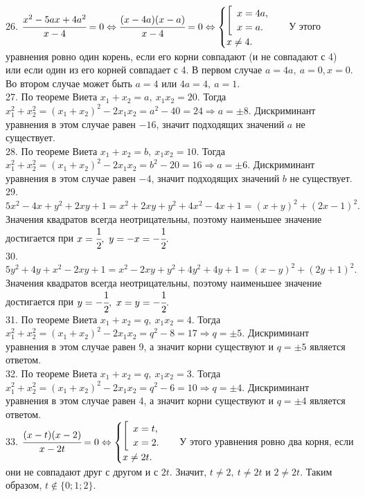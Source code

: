 \documentclass[12pt]{article}
\begin{document}
26. $\cfrac{x^2-5ax+4a^2}{x-4}=0\Leftrightarrow\cfrac{(x-4a)(x-a)}{x-4}=0\Leftrightarrow\begin{cases}\left[\begin{array}{l}x=4a,\\ x=a.\end{array}\right.\\x\neq4.\end{cases}$ У этого уравнения ровно один корень, если его корни совпадают (и не совпадают с 4) или если один из его корней совпадает с 4. В первом случае $a=4a,\ a=0, x=0.$ Во втором случае может быть $a=4$ или $4a=4,\ a=1.$\\
27. По теореме Виета $x_1+x_2=a,\ x_1x_2=20.$ Тогда $x_1^2+x_2^2=(x_1+x_2)^2-2x_1x_2=a^2-40=24\Rightarrow a=\pm8.$ Дискриминант уравнения в этом случае равен $-16$, значит подходящих значений $a$ не существует.\\
28. По теореме Виета $x_1+x_2=b,\ x_1x_2=10.$ Тогда $x_1^2+x_2^2=(x_1+x_2)^2-2x_1x_2=b^2-20=16\Rightarrow a=\pm6.$ Дискриминант уравнения в этом случае равен $-4$, значит подходящих значений $b$ не существует.\\
29. $5x^2-4x+y^2+2xy+1=x^2+2xy+y^2+4x^2-4x+1=(x+y)^2+(2x-1)^2.$ Значения квадратов всегда неотрицательны, поэтому наименьшее значение достигается при $x=\cfrac{1}{2},\ y=-x=-\cfrac{1}{2}.$\\
30. $5y^2+4y+x^2-2xy+1=x^2-2xy+y^2+4y^2+4y+1=(x-y)^2+(2y+1)^2.$ Значения квадратов всегда неотрицательны, поэтому наименьшее значение достигается при $y=-\cfrac{1}{2},\ x=y=-\cfrac{1}{2}.$\\
31. По теореме Виета $x_1+x_2=q,\ x_1x_2=4.$ Тогда $x_1^2+x_2^2=(x_1+x_2)^2-2x_1x_2=q^2-8=17\Rightarrow q=\pm5.$ Дискриминант уравнения в этом случае равен 9, а значит корни существуют и $q=\pm5$ является ответом.\\
32. По теореме Виета $x_1+x_2=q,\ x_1x_2=3.$ Тогда $x_1^2+x_2^2=(x_1+x_2)^2-2x_1x_2=q^2-6=10\Rightarrow q=\pm4.$ Дискриминант уравнения в этом случае равен 4, а значит корни существуют и $q=\pm4$ является ответом.\\
33. $\cfrac{(x-t)(x-2)}{x-2t}=0\Leftrightarrow\begin{cases}\left[\begin{array}{l}x=t,\\ x=2.\end{array}\right.\\x\neq2t.\end{cases}$ У этого уравнения ровно два корня, если они не совпадают друг с другом и с $2t.$ Значит, $t\neq2,\ t\neq2t$ и $2\neq2t.$ Таким образом, $t\notin\{0; 1; 2\}.$\\
\end{document}
